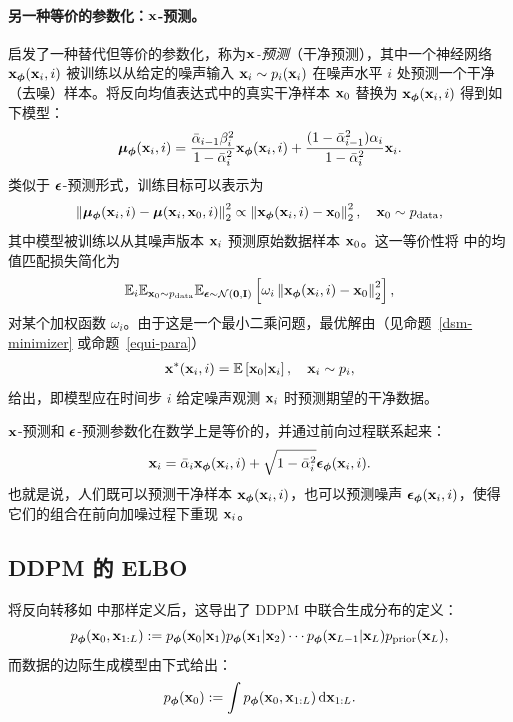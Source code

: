 \paragraph{另一种等价的参数化：${\mathbf{x}}$-预测。}
 启发了一种替代但等价的参数化，称为\emph{${\mathbf{x}}$-预测}（干净预测），其中一个神经网络 ${\mathbf{x}}_{\bm{\phi}}({\mathbf{x}}_i, i)$ 被训练以从给定的噪声输入 ${\mathbf{x}}_i \sim p_i({\mathbf{x}}_i)$ 在噪声水平 $i$ 处预测一个干净（去噪）样本。将反向均值表达式中的真实干净样本 ${\mathbf{x}}_0$ 替换为 ${\mathbf{x}}_{\bm{\phi}}({\mathbf{x}}_i, i)$ 得到如下模型：
\begin{align*}
\bm{\mu}_{\bm{\phi}}({\mathbf{x}}_i, i) = \frac{\bar{\alpha}_{i-1} \beta_i^2}{1 - \bar{\alpha}_i^2} {\mathbf{x}}_{\bm{\phi}}({\mathbf{x}}_i, i) + \frac{(1 - \bar{\alpha}_{i-1}^2)\alpha_i}{1 - \bar{\alpha}_i^2} {\mathbf{x}}_i.
\end{align*}
类似于 ${\bm{\epsilon}}$-预测形式，训练目标可以表示为
\[
\left\| \bm{\mu}_{\bm{\phi}}({\mathbf{x}}_i, i) - \bm{\mu}({\mathbf{x}}_i, {\mathbf{x}}_0, i) \right\|_2^2 \propto \left\| {\mathbf{x}}_{\bm{\phi}}({\mathbf{x}}_i, i) - {\mathbf{x}}_0 \right\|_2^2, \quad {\mathbf{x}}_0 \sim p_{\text{data}},
\]
其中模型被训练以从其噪声版本 ${\mathbf{x}}_i$ 预测原始数据样本 ${\mathbf{x}}_0$。这一等价性将  中的均值匹配损失简化为
\[
\mathbb{E}_{i} \mathbb{E}_{{\mathbf{x}}_0 \sim p_{\text{data}}} \mathbb{E}_{\boldsymbol{\epsilon} \sim \mathcal{N}(\mathbf{0}, \mathbf{I})} \left[\omega_i \left\| {\mathbf{x}}_{\bm{\phi}}({\mathbf{x}}_i, i) - {\mathbf{x}}_0 \right\|_2^2 \right],
\]
对某个加权函数 $\omega_i$。由于这是一个最小二乘问题，最优解由（见命题~\ref{dsm-minimizer} 或命题~\ref{equi-para}）
\begin{align}\label{eq:ddpm-clean-minimizer}
    {\mathbf{x}}^*({\mathbf{x}}_i, i) = \mathbb{E}\left[ {\mathbf{x}}_0|{\mathbf{x}}_i \right], \quad {\mathbf{x}}_i \sim p_i,
\end{align}
给出，即模型应在时间步 $i$ 给定噪声观测 ${\mathbf{x}}_i$ 时预测期望的干净数据。

${\mathbf{x}}$-预测和 ${\bm{\epsilon}}$-预测参数化在数学上是等价的，并通过前向过程联系起来：
\begin{equation}\label{eq:ddpm-clean-noise}
    {\mathbf{x}}_i = \bar{\alpha}_i {\mathbf{x}}_{\bm{\phi}}({\mathbf{x}}_i, i) + \sqrt{1 - \bar{\alpha}_i^2}   \boldsymbol{\epsilon}_{\bm{\phi}}({\mathbf{x}}_i, i).
\end{equation}
也就是说，人们既可以预测干净样本 ${\mathbf{x}}_{\bm{\phi}}({\mathbf{x}}_i, i)$，也可以预测噪声 $\boldsymbol{\epsilon}_{\bm{\phi}}({\mathbf{x}}_i, i)$，使得它们的组合在前向加噪过程下重现 ${\mathbf{x}}_i$。 




\subsection{DDPM 的 ELBO}\label{subsec:ddpm-elbo} 将反向转移如  中那样定义后，这导出了 DDPM 中联合生成分布的定义：
\[
p_{\bm{\phi}}({\mathbf{x}}_0, {\mathbf{x}}_{1:L}) := p_{\bm{\phi}}({\mathbf{x}}_0|{\mathbf{x}}_1)  p_{\bm{\phi}}({\mathbf{x}}_1|{\mathbf{x}}_2)\cdots p_{\bm{\phi}}({\mathbf{x}}_{L-1}|{\mathbf{x}}_L)   p_{\text{prior}}({\mathbf{x}}_L),
\]
而数据的边际生成模型由下式给出：
\begin{align*}
    p_{\bm{\phi}}({\mathbf{x}}_0) := \int p_{\bm{\phi}}({\mathbf{x}}_0, {\mathbf{x}}_{1:L}) \mathop{}\!\mathrm{d} {\mathbf{x}}_{1:L}.
\end{align*}

